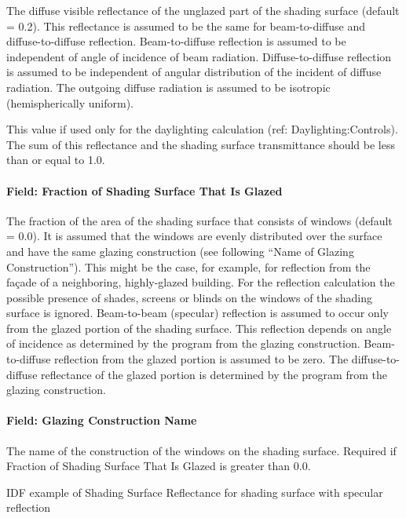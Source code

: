 The diffuse visible reflectance of the unglazed part of the shading surface (default = 0.2). This reflectance is assumed to be the same for beam-to-diffuse and diffuse-to-diffuse reflection. Beam-to-diffuse reflection is assumed to be independent of angle of incidence of beam radiation. Diffuse-to-diffuse reflection is assumed to be independent of angular distribution of the incident of diffuse radiation. The outgoing diffuse radiation is assumed to be isotropic (hemispherically uniform).

This value if used only for the daylighting calculation (ref: Daylighting:Controls). The sum of this reflectance and the shading surface transmittance should be less than or equal to 1.0.

\paragraph{Field: Fraction of Shading Surface That Is Glazed}\label{field-fraction-of-shading-surface-that-is-glazed}

The fraction of the area of the shading surface that consists of windows (default = 0.0). It is assumed that the windows are evenly distributed over the surface and have the same glazing construction (see following ``Name of Glazing Construction''). This might be the case, for example, for reflection from the façade of a neighboring, highly-glazed building. For the reflection calculation the possible presence of shades, screens or blinds on the windows of the shading surface is ignored. Beam-to-beam (specular) reflection is assumed to occur only from the glazed portion of the shading surface. This reflection depends on angle of incidence as determined by the program from the glazing construction. Beam-to-diffuse reflection from the glazed portion is assumed to be zero. The diffuse-to-diffuse reflectance of the glazed portion is determined by the program from the glazing construction.

\paragraph{Field: Glazing Construction Name}\label{field-glazing-construction-name}

The name of the construction of the windows on the shading surface. Required if Fraction of Shading Surface That Is Glazed is greater than 0.0.

IDF example of Shading Surface Reflectance for shading surface with specular reflection

